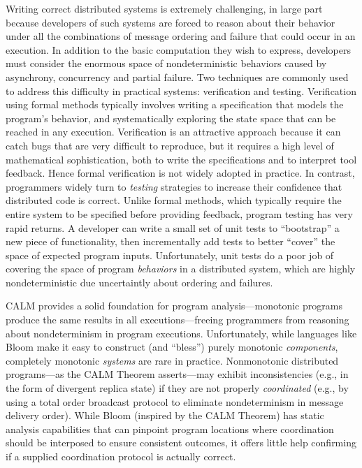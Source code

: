 

Writing correct distributed systems is extremely challenging, in large part
because developers of such systems are forced to reason
about their behavior under all the combinations of message ordering and failure
that could occur in an execution.
In addition to the basic computation they wish to express, developers
must consider the enormous space of nondeterministic behaviors caused by 
asynchrony, concurrency and partial failure.
Two techniques are commonly used
to address this difficulty in practical systems: verification and testing.
Verification using formal methods typically involves writing a specification
that models the program's behavior, and systematically exploring the state 
space that can be reached in any execution.  Verification is an attractive 
approach because it can catch bugs that are very difficult to reproduce,
but it requires a high level of mathematical sophistication, both to write the 
specifications and to interpret tool feedback.
Hence formal verification is not widely adopted in practice.  
In contrast, programmers widely turn to \emph{testing} strategies to increase
their confidence that distributed code is correct.  Unlike formal methods, 
which typically require the entire system to be specified before providing 
feedback, program testing has very rapid returns.  A developer can write a 
small set of unit tests to ``bootstrap'' a new piece of functionality, then
incrementally add tests to better ``cover'' the space of expected program 
inputs.  Unfortunately, unit tests do a poor job of covering the space of
program \emph{behaviors} in a distributed system, which are highly
nondeterministic due uncertaintly about ordering and failures.

CALM provides a solid foundation for program analysis---monotonic programs
produce the same results in all executions---freeing programmers from reasoning
about nondeterminism in program executions.  Unfortunately, while languages
like Bloom make it easy to construct (and ``bless'') purely monotonic 
\emph{components}, completely monotonic \emph{systems} are rare in practice.
Nonmonotonic distributed programs---as the CALM Theorem asserts---may exhibit
inconsistencies (e.g., in the form of divergent replica state)
if they are not
properly \emph{coordinated} (e.g., by using a total order broadcast protocol
to eliminate nondeterminism in message delivery order).
While Bloom (inspired by the CALM Theorem) has static analysis capabilities
that can pinpoint program locations where coordination should be interposed
to ensure consistent outcomes, it offers little help confirming if a supplied
coordination protocol is actually correct.

